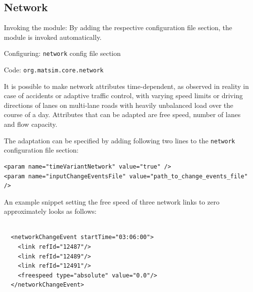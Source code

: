 \subsection{Network}
\label{sec:network}
\begin{compactitem}
\item Invoking the module: By adding the respective configuration file section, the module is invoked automatically.
\item Configuring: \lstinline|network| config file section
\item Code: \lstinline|org.matsim.core.network|
\end{compactitem}

It is possible to make network attributes time-dependent, as observed in reality in case of accidents or adaptive traffic control, with varying speed limits or driving directions of lanes on multi-lane roads with heavily unbalanced load over the course of a day. Attributes that can be adapted are free speed, number of lanes and flow capacity.

The adaptation can be specified by adding following two lines to the \lstinline|network| configuration file section:
\begin{lstlisting}
<param name="timeVariantNetwork" value="true" />
<param name="inputChangeEventsFile" value="path_to_change_events_file" />
\end{lstlisting}
%
An example snippet setting the free speed of three network links to zero approximately looks as follows:
%
\begin{lstlisting}

  <networkChangeEvent startTime="03:06:00">
    <link refId="12487"/>
    <link refId="12489"/>
    <link refId="12491"/>
    <freespeed type="absolute" value="0.0"/>
  </networkChangeEvent>

\end{lstlisting}
%

